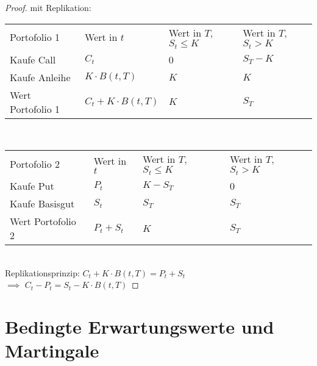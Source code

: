 \begin{proof} %
	mit Replikation:\\
	\begin{tabular}{l|l|l|l} %
		Portofolio 1 & Wert in $t$ & Wert in $T$, $S_t \le K$ & Wert in $T$, $S_t > K$\\
		Kaufe Call & $C_t$ & 0 & $S_T - K$\\
		Kaufe Anleihe & $K \cdot B(t,T)$ & $K$ & $K$\\
		Wert Portofolio 1 & $C_t + K\cdot B(t,T)$ & $K$ & $S_T$\\
	\end{tabular}\\
	\newline
	\begin{tabular}{l|l|l|l} %
		Portofolio 2 & Wert in $t$ & Wert in $T$, $S_t \le K$ & Wert in $T$, $S_t > K$\\
		Kaufe Put & $P_t$ & $K-S_T$ & 0\\
		Kaufe Basisgut & $S_t$ & $S_T$ & $S_T$\\
		Wert Portofolio 2 & $P_t + S_t$ & $K$ & $S_T$\\
	\end{tabular}\\
	Replikationsprinzip: $C_t + K\cdot B(t,T) = P_t + S_t$\\
	$\implies$ $C_t - P_t = S_t - K\cdot B(t,T)$
\end{proof} %
\section{Bedingte Erwartungswerte und Martingale} %
